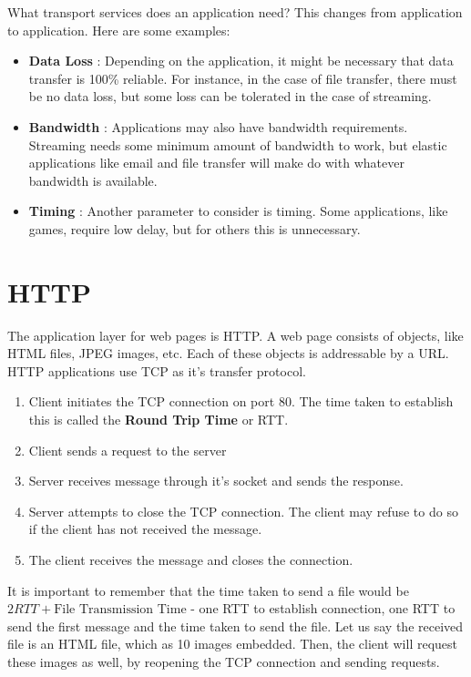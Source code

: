 \documentclass[12pt,letterpaper]{book}
\theoremstyle{definition}
\begin{document}
What transport services does an application need? This changes from application to application. Here are some examples:

\begin{itemize}
  \item \textbf{Data Loss} : Depending on the application, it might be necessary that data transfer is 100\% reliable. For instance, in the case of file transfer, there must be no data loss, but some loss can be tolerated in the case of streaming.
  \item \textbf{Bandwidth} : Applications may also have bandwidth requirements. Streaming needs some minimum amount of bandwidth to work, but elastic applications like email and file transfer will make do with whatever bandwidth is available.
  \item \textbf{Timing} : Another parameter to consider is timing. Some applications, like games, require low delay, but for others this is unnecessary.
\end{itemize}

\section{HTTP}

The application layer for web pages is HTTP. A web page consists of objects, like HTML files, JPEG images, etc. Each of these objects is addressable by a URL. HTTP applications use TCP as it's transfer protocol.

\begin{enumerate}
  \item Client initiates the TCP connection on port 80. The time taken to establish this is called the \textbf{Round Trip Time} or RTT.
  \item Client sends a request to the server
  \item Server receives message through it's socket and sends the response.
  \item Server attempts to close the TCP connection. The client may refuse to do so if the client has not received the message.
  \item The client receives the message and closes the connection.
\end{enumerate}

It is important to remember that the time taken to send a file would be $2RTT + \text{File Transmission Time}$ - one RTT to establish connection, one RTT to send the first message and the time taken to send the file. Let us say the received file is an HTML file, which as 10 images embedded. Then, the client will request these images as well, by reopening the TCP connection and sending requests.
\end{document}
